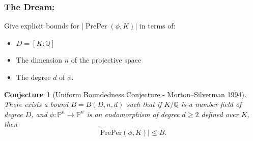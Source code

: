 \documentclass{beamer}
\def\PP{{\mathbb P}}
\def\QQ{{\mathbb Q}}
\DeclareMathOperator{\PrePer}{PrePer}
\theoremstyle{thmstyle}
\newtheorem*{mythm}{Theorem}
\theoremstyle{mystyle}
\newtheorem*{conjecture}{Conjecture}
\theoremstyle{qstnstyle}
\begin{document}
\begin{frame}
\frametitle{The Dream:}
Give explicit bounds for $|\PrePer(\phi,K)|$ in terms of:\pause
\begin{itemize}

\item  $D=[K: \QQ]$ 

\item The dimension $n$ of the projective space 

\item The degree $d$ of $\phi$.
\end{itemize}

\pause

\begin{conjecture}[Uniform Boundedness Conjecture - Morton--Silverman
  1994]
There exists a bound $B = B(D,n,d)$ such that if $K/\mathbb{Q}$ is a number field of degree $D$, and $\phi:\mathbb{P}^n\rightarrow\mathbb{P}^n$ is an endomorphism of degree $d\geq{2}$ defined over $K$, then 
$$|\text{PrePer}(\phi,K)| \leq B.$$
\end{conjecture}
\end{frame}


%
%
%
%
\end{document}
